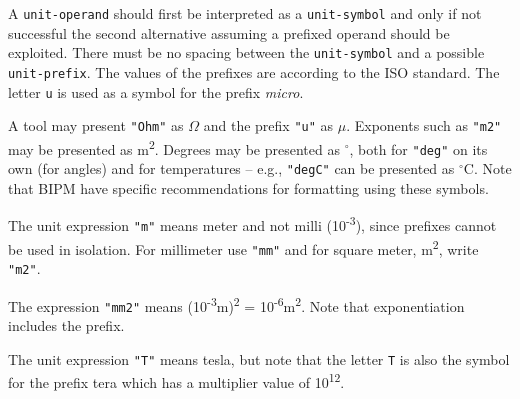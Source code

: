 A \lstinline[language=grammar]!unit-operand! should first be interpreted as a \lstinline[language=grammar]!unit-symbol! and only if not successful the second alternative assuming a prefixed operand should be exploited.
There must be no spacing between the \lstinline[language=grammar]!unit-symbol! and a possible \lstinline[language=grammar]!unit-prefix!.
The values of the prefixes are according to the ISO standard.
The letter \lstinline!u! is used as a symbol for the prefix \emph{micro}.

\begin{nonnormative}
A tool may present \lstinline!"Ohm"! as $\Omega$ and the prefix \lstinline!"u"! as $\mu$.
Exponents such as \lstinline!"m2"! may be presented as m\textsuperscript{2}.
Degrees may be presented as $^{\circ}$, both for \lstinline!"deg"! on its own (for angles) and for temperatures -- e.g., \lstinline!"degC"! can be presented as $^{\circ}$C.
Note that BIPM have specific recommendations for formatting using these symbols.
\end{nonnormative}

\begin{example}
The unit expression \lstinline!"m"! means meter and not milli (10\textsuperscript{-3}), since prefixes cannot be used in isolation.
For millimeter use \lstinline!"mm"! and for square meter, m\textsuperscript{2}, write \lstinline!"m2"!.

The expression \lstinline!"mm2"! means (10\textsuperscript{-3}m)\textsuperscript{2} = 10\textsuperscript{-6}m\textsuperscript{2}.
Note that exponentiation includes the prefix.

The unit expression \lstinline!"T"! means tesla, but note that the letter \lstinline!T! is also the symbol for the prefix tera which has a multiplier value of 10\textsuperscript{12}.
\end{example}
